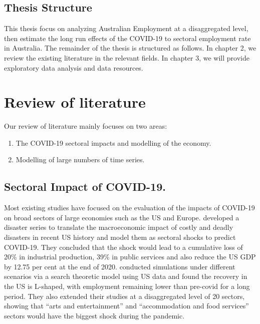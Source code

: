 \documentclass{monashthesis}
\begin{document}
\hypertarget{thesis-structure}{%
\section{Thesis Structure}\label{thesis-structure}}

This thesis focus on analyzing Australian Employment at a disaggregated level, then estimate the long run effects of the COVID-19 to sectoral employment rate in Australia. The remainder of the thesis is structured as follows. In chapter 2, we review the existing literature in the relevant fields. In chapter 3, we will provide exploratory data analysis and data resources.

\hypertarget{review-of-literature}{%
\chapter{Review of literature}\label{review-of-literature}}

Our review of literature mainly focuses on two areas:

\begin{enumerate}
\def\labelenumi{\arabic{enumi}.}
\item
  The COVID-19 sectoral impacts and modelling of the economy.
\item
  Modelling of large numbers of time series.
\end{enumerate}

\hypertarget{sectoral-impact-of-covid-19.}{%
\section{Sectoral Impact of COVID-19.}\label{sectoral-impact-of-covid-19.}}

Most existing studies have focused on the evaluation of the impacts of COVID-19 on broad sectors of large economies such as the US and Europe. \textcite{ludvigson2020covid} developed a disaster series to translate the macroeconomic impact of costly and deadly disasters in recent US history and model them as sectoral shocks to predict COVID-19. They concluded that the shock would lead to a cumulative loss of 20\% in industrial production, 39\% in public services and also reduce the US GDP by 12.75 per cent at the end of 2020. \textcite{gregory2020pandemic} conducted simulations under different scenarios via a search theoretic model using US data and found the recovery in the US is L-shaped, with employment remaining lower than pre-covid for a long period. They also extended their studies at a disaggregated level of 20 sectors, showing that ``arts and entertainment'' and ``accommodation and food services'' sectors would have the biggest shock during the pandemic.
\end{document}
